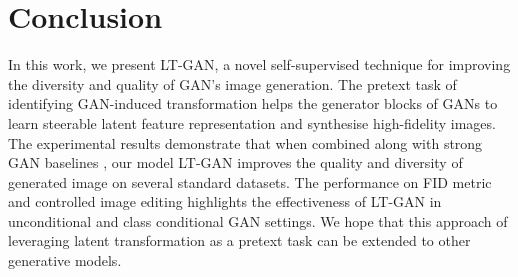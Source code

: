 \documentclass[10pt,twocolumn,letterpaper]{article}
\begin{document}
\section{Conclusion}
In this work, we present LT-GAN, a novel self-supervised technique for improving the diversity and quality of GAN’s image generation. The pretext task of identifying GAN-induced transformation helps the generator blocks of GANs to learn steerable latent feature representation and synthesise high-fidelity images. The experimental results demonstrate that when combined along with strong GAN baselines \cite{biggan2018brock, stylegan2019karras}, our model LT-GAN improves the quality and diversity of generated image on several standard datasets. The performance on FID metric and controlled image editing highlights the effectiveness of LT-GAN in unconditional and class conditional GAN settings. We hope that this approach of leveraging latent transformation as a pretext task can be extended to other generative models.









































































{\small


}
\end{document}
